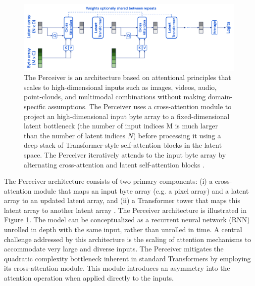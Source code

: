 \begin{figure}
    \centering
    \includegraphics[width=\textwidth]{figures/figure_background_perceiver_architecture.png}
    \caption{The Perceiver is an architecture based on attentional principles that scales to high-dimensional inputs such as images, videos, audio, point-clouds, and multimodal combinations without making domain-specific assumptions. The Perceiver uses a cross-attention module to project an high-dimensional input byte array to a fixed-dimensional latent bottleneck (the number of input indices M is much larger than the number of latent indices $N$) before processing it using a deep stack of Transformer-style self-attention blocks in the latent space. The Perceiver iteratively attends to the input byte array by alternating cross-attention and latent self-attention blocks \cite{jaeglePerceiverGeneralPerception2021}.}
    \label{fig:figure_background_perceiver_architecture}
\end{figure}

The Perceiver architecture consists of two primary components: (i) a cross-attention module that maps an input byte array (e.g. a pixel array) and a latent array to an updated latent array, and (ii) a Transformer tower that maps this latent array to another latent array \cite{jaeglePerceiverGeneralPerception2021}. The Perceiver architecture is illustrated in Figure \ref{fig:figure_background_perceiver_architecture}. The model can be conceptualized as a recurrent neural network (RNN) unrolled in depth with the same input, rather than unrolled in time. A central challenge addressed by this architecture is the scaling of attention mechanisms to accommodate very large and diverse inputs. The Perceiver mitigates the quadratic complexity bottleneck inherent in standard Transformers by employing its cross-attention module. This module introduces an asymmetry into the attention operation when applied directly to the inputs.

